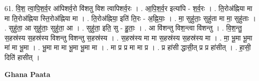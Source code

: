 \documentclass[17pt]{extarticle}
\begin{document}
61. वि॒श॒ त्वा॒पि॒श॒र्व॒र आ॑पिशर्व॒रो वि॑शतु विश त्वापिशर्व॒रः । . आ॒पि॒श॒र्व॒र इत्या॑पि - श॒र्व॒रः । . ति॒रोअ॑ह्निया मा मा ति॒रोअ॑ह्निया स्ति॒रोअ॑ह्निया मा । . ति॒रोअ॑ह्निया॒ इति॑ ति॒रः - अ॒ह्नि॒याः॒ । . मा॒ सुहु॑ताः॒ सुहु॑ता मा मा॒ सुहु॑ताः । . सुहु॑ता॒ आ सुहु॑ताः॒ सुहु॑ता॒ आ । . सुहु॑ता॒ इति॒ सु - हु॒ताः॒ । . आ वि॑शन्तु विश॒न्त्वा वि॑शन्तु । . वि॒श॒न्तु॒ स॒हस्र॑स्य स॒हस्र॑स्य विशन्तु विशन्तु स॒हस्र॑स्य । . स॒हस्र॑स्य मा मा स॒हस्र॑स्य स॒हस्र॑स्य मा । . मा॒ भू॒मा भू॒मा मा॑ मा भू॒मा । . भू॒मा मा मा भू॒मा भू॒मा मा । . मा प्र प्र मा मा प्र । . प्र हा॑सी द्धासी॒त् प्र प्र हा॑सीत् । . हा॒सी॒ दिति॑ हासीत् । \newline

\textbf{Ghana Paata } \newline
\end{document}
